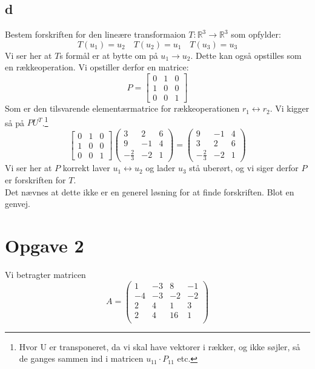 \documentclass[a4paper,fleqn]{article}
\newcommand{\RR}{\mathbb{R}}
\begin{document}
	\subsection{d}
	Bestem forskriften for den lineære transformaion $T: \RR^3 \rightarrow \RR^3$ som opfylder:
	\[ T(u_1) = u_2 \quad T(u_2) = u_1 \quad T(u_3) = u_3 \]
	Vi ser her at $T$s formål er at bytte om på $u_1 \rightarrow u_2$. Dette kan også opstilles
	som en rækkeoperation. Vi opstiller derfor en matrice:
	\[ P = \begin{bmatrix}0&1&0\\1&0&0\\0&0&1\end{bmatrix} \]
	Som er den tilsvarende elementærmatrice for rækkeoperationen $r_1 \leftrightarrow r_2$.
	Vi kigger så på $PU^T$.\footnote{Hvor U er transponeret, da vi skal have vektorer i rækker,
	og ikke søjler, så de ganges sammen ind i matricen $u_{11} \cdot P_{11}$ etc.}
	\[ \begin{bmatrix}0&1&0\\1&0&0\\0&0&1\end{bmatrix}
	\begin{pmatrix}3&2&6\\9&-1&4\\-\frac{2}{3}&-2&1\end{pmatrix}
	= 
	\begin{pmatrix}9&-1&4\\3&2&6\\-\frac{2}{3}&-2&1\end{pmatrix}
	\] Vi ser her at $P$ korrekt laver $u_1 \leftrightarrow u_2$ og lader $u_3$ stå uberørt,
	og vi siger derfor $P$ er forskriften for $T$.\\

	Det nævnes at dette ikke er en generel løsning for at finde forskriften. Blot en genvej.


	\section{Opgave 2}
	Vi betragter matricen
	\[A = \begin{pmatrix}
			1 & -3 & 8 & -1\\
			-4 & -3 & -2 & -2\\
			2 & 4 & 1 & 3\\
			2 & 4 & 16 & 1\\
	\end{pmatrix}\]
\end{document}
